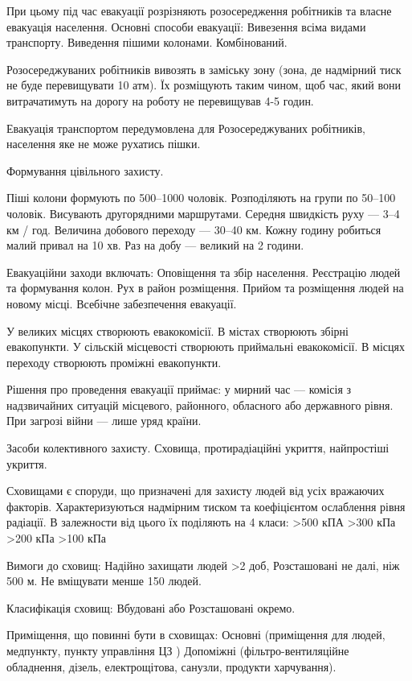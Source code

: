 \documentclass[a4paper,10pt,notitlepage,pdftex,headsepline]{scrartcl}
\begin{document}
  При цьому під час евакуації розрізняють розосередження робітників та власне
  евакуація населення.
  Основні способи евакуації:
    Вивезення всіма видами транспорту.
    Виведення пішими колонами.
    Комбінований.

  Розосереджуваних робітників вивозять в заміську зону (зона, де надмірний
  тиск не буде перевищувати 10 атм).
  Їх розміщують таким чином, щоб час, який вони витрачатимуть на дорогу на
  роботу не перевищував 4-5 годин.

  Евакуація транспортом передумовлена для Розосереджуваних робітників,
  населення яке не може рухатись пішки.

  Формування цівільного захисту.

  Піші колони формують по 500--1000 чоловік.
  Розподіляють на групи по 50--100 чоловік.
  Висувають другорядними маршрутами.
  Середня швидкість руху --- 3--4 км / год.
  Величина добового переходу --- 30--40 км.
  Кожну годину робиться малий привал на 10 хв.
  Раз на добу --- великий на 2 години.

  Евакуаційни заходи включать:
    Оповіщення та збір населення.
    Реєстрацію людей та формування колон.
    Рух в район розміщення.
    Прийом та розміщення людей на новому місці.
    Всебічне забезпечення евакуації.


  У великих місцях створюють евакокомісії.
  В містах створюють збірні евакопункти.
  У сільскій місцевості створюють приймальні евакокомісії.
  В місцях переходу створюють проміжні евакопункти.

  Рішення про проведення евакуації приймає:
    у мирний час --- комісія з надзвичайних ситуацій місцевого, районного,
    обласного або державного рівня.
    При загрозі війни --- лише уряд країни.

  Засоби колективного захисту.
    Сховища, протирадіаційні укриття, найпростіші укриття.

    Сховищами є споруди, що призначені для захисту людей від усіх вражаючих
    факторів.
    Характеризуються надмірним тиском та коефіцієнтом ослаблення рівня
    радіації.
    В залежности від цього їх поділяють на 4 класи:
      >500 кПА
      >300 кПа
      >200 кПа
      >100 кПа

    Вимоги до сховищ:
      Надійно захищати людей >2 доб,
      Розсташовані не далі, ніж 500 м.
      Не вміщувати менше 150 людей.

    Класифікація сховищ:
      Вбудовані або Розсташовані окремо.

    Приміщення, що повинні бути в сховищах:
      Основні (приміщення для людей, медпункту, пункту управління ЦЗ )
      Допоміжні (фільтро-вентиляційне обладнення, дізель, електрощітова,
        санузли, продукти харчування).
\end{document}
